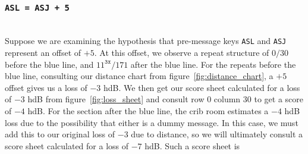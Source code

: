 \subsubsection{\texttt{ASL = ASJ + 5}}
\text{}\\Suppose we are examining the hypothesis that pre-message
keys \texttt{ASL} and \texttt{ASJ} represent an offset of $+5$. At
this offset, we observe a repeat structure of $0/30$ before the
blue line, and $11^\texttt{3x}/171$ after the blue line. For the
repeats before the blue line, consulting our distance chart from
figure~\ref{fig:distance_chart}, a $+5$ offset gives us a loss of
$-3$ hdB. We then get our score sheet calculated for a loss of $-3$
hdB from figure~\ref{fig:loss_sheet} and consult row $0$ column
$30$ to get a score of $-4$ hdB. For the section after the blue
line, the crib room estimates a $-4$ hdB loss due to the
possibility that either is a dummy message. In this case, we must
add this to our original loss of $-3$ due to distance, so we will
ultimately consult a score sheet calculated for a loss of $-7$ hdB.
Such a score sheet is

